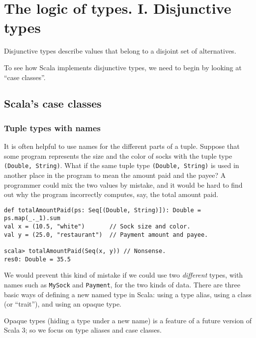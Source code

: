 
\chapter{The logic of types. I. Disjunctive types\label{chap:Disjunctive-types}}

Disjunctive types describe values that belong to a disjoint set of
alternatives. 

To see how Scala implements disjunctive types, we need to begin by
looking at \textsf{``}case classes\textsf{''}.

\section{Scala\textsf{'}s case classes}

\subsection{Tuple types with names}

It is often helpful to use names for the different parts of a tuple.
Suppose that some program represents the size and the color of socks
with the tuple type \lstinline!(Double, String)!. What if the same
tuple type \lstinline!(Double, String)! is used in another place
in the program to mean the amount paid and the payee? A programmer
could mix the two values by mistake, and it would be hard to find
out why the program incorrectly computes, say, the total amount paid.
\begin{lstlisting}
def totalAmountPaid(ps: Seq[(Double, String)]): Double = ps.map(_._1).sum
val x = (10.5, "white")       // Sock size and color.
val y = (25.0, "restaurant")  // Payment amount and payee.

scala> totalAmountPaid(Seq(x, y)) // Nonsense.
res0: Double = 35.5
\end{lstlisting}

We would prevent this kind of mistake if we could use two \emph{different}
types, with names such as \lstinline!MySock! and \lstinline!Payment!,
for the two kinds of data. There are  three basic ways of defining
a new named type in Scala: using a type alias, using a class (or \textsf{``}trait\textsf{''}),
and using an opaque type. 

Opaque types (hiding a type under a new name) is a feature of a future
version of Scala 3; so we focus on type aliases and case classes.

